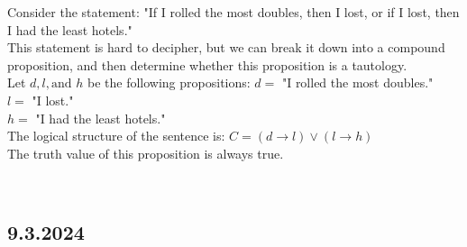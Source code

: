 \documentclass[11pt]{scrartcl}
\begin{document}
\begin{example}
    Consider the statement: "If I rolled the most doubles, then I lost, or if I lost, then I had the least hotels."\\
    This statement is hard to decipher, but we can break it down into a compound proposition, and then determine whether this proposition is a tautology.\\
    Let $d, l, \text{and } h$ be the following propositions:
    $d=$ "I rolled the most doubles."\\
    $l=$ "I lost."\\
    $h=$ "I had the least hotels."\\
    The logical structure of the sentence is: $C = (d\rightarrow l) \vee (l \rightarrow h)$\\
    The truth value of this proposition is always true.
\end{example}
\Line\\
\subsection{9.3.2024}
\end{document}

